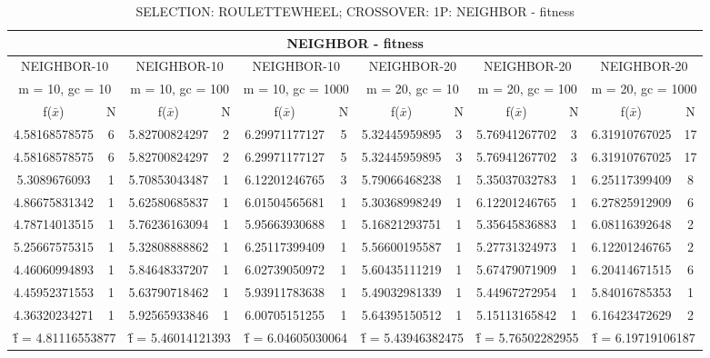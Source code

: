 \begin{table}[H]
	\centering
	\caption{SELECTION: ROULETTEWHEEL; CROSSOVER: 1P: NEIGHBOR - fitness}
	\begin{adjustbox}{width=1\textwidth}
		\begin{tabular}{ |c|c||c|c||c|c||c|c||c|c||c|c| }
			\hline
			\multicolumn{12}{|c|}{NEIGHBOR - fitness} \\
			\hline
			\multicolumn{2}{|c||}{NEIGHBOR-10} & \multicolumn{2}{c||}{NEIGHBOR-10} & \multicolumn{2}{c||}{NEIGHBOR-10} & \multicolumn{2}{c||}{NEIGHBOR-20} & \multicolumn{2}{c||}{NEIGHBOR-20} & \multicolumn{2}{c|}{NEIGHBOR-20}\\
			\hline
			\multicolumn{2}{|c||}{m = 10, gc = 10} & \multicolumn{2}{c||}{m = 10, gc = 100} & \multicolumn{2}{c||}{m = 10, gc = 1000} & \multicolumn{2}{c||}{m = 20, gc = 10} & \multicolumn{2}{c||}{m = 20, gc = 100} & \multicolumn{2}{c|}{m = 20, gc = 1000}\\
			\hline
			f($\bar{x}$) & N & f($\bar{x}$) & N & f($\bar{x}$) & N & f($\bar{x}$) & N & f($\bar{x}$) & N & f($\bar{x}$) & N\\
			\hline
			\hline
			4.58168578575 & 6 & 5.82700824297 & 2 & 6.29971177127 & 5 & 5.32445959895 & 3 & 5.76941267702 & 3 & 6.31910767025 & 17\\
			\hline
			4.58168578575 & 6 & 5.82700824297 & 2 & 6.29971177127 & 5 & 5.32445959895 & 3 & 5.76941267702 & 3 & 6.31910767025 & 17\\
			5.3089676093 & 1 & 5.70853043487 & 1 & 6.12201246765 & 3 & 5.79066468238 & 1 & 5.35037032783 & 1 & 6.25117399409 & 8\\
			4.86675831342 & 1 & 5.62580685837 & 1 & 6.01504565681 & 1 & 5.30368998249 & 1 & 6.12201246765 & 1 & 6.27825912909 & 6\\
			4.78714013515 & 1 & 5.76236163094 & 1 & 5.95663930688 & 1 & 5.16821293751 & 1 & 5.35645836883 & 1 & 6.08116392648 & 2\\
			5.25667575315 & 1 & 5.32808888862 & 1 & 6.25117399409 & 1 & 5.56600195587 & 1 & 5.27731324973 & 1 & 6.12201246765 & 2\\
			4.46060994893 & 1 & 5.84648337207 & 1 & 6.02739050972 & 1 & 5.60435111219 & 1 & 5.67479071909 & 1 & 6.20414671515 & 6\\
			4.45952371553 & 1 & 5.63790718462 & 1 & 5.93911783638 & 1 & 5.49032981339 & 1 & 5.44967272954 & 1 & 5.84016785353 & 1\\
			4.36320234271 & 1 & 5.92565933846 & 1 & 6.00705151255 & 1 & 5.64395150512 & 1 & 5.15113165842 & 1 & 6.16423472629 & 2\\
			\hline
			\multicolumn{2}{|c||}{\^{f} = 4.81116553877} & \multicolumn{2}{c||}{\^{f} = 5.46014121393} & \multicolumn{2}{c||}{\^{f} = 6.04605030064} & \multicolumn{2}{c||}{\^{f} = 5.43946382475} & \multicolumn{2}{c||}{\^{f} = 5.76502282955} & \multicolumn{2}{c|}{\^{f} = 6.19719106187}\\
			\hline
		\end{tabular}
	\end{adjustbox}
\end{table}
